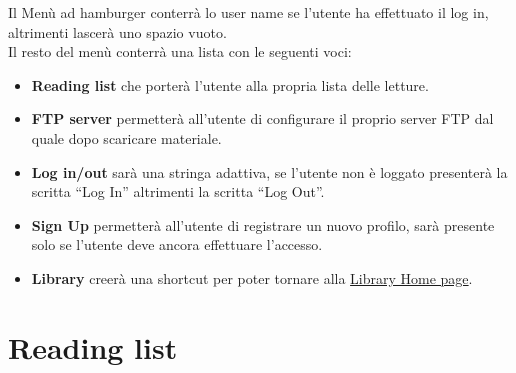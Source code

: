 \documentclass{report}
\begin{document}
Il Menù ad hamburger conterrà lo user name se l'utente ha effettuato il log in, altrimenti lascerà uno spazio vuoto.\\
Il resto del menù conterrà una lista con le seguenti voci:
\begin{itemize}
   \item \textbf{Reading list} che porterà l'utente alla propria lista delle letture.
   \item \textbf{FTP server} permetterà all'utente di configurare il proprio server FTP dal quale dopo scaricare materiale.
   \item \textbf{Log in/out} sarà una stringa adattiva, se l'utente non è loggato presenterà la scritta ``Log In'' altrimenti la scritta ``Log Out''.
  \item \textbf{Sign Up} permetterà all'utente di registrare un nuovo profilo, sarà presente solo se l'utente deve ancora effettuare l'accesso.
  \item \textbf{Library} creerà una shortcut per poter tornare alla \hyperref[sec:home]{Library \- Home page}.
\end{itemize}

\section{Reading list}\label{sec:reading_list}
\end{document}
